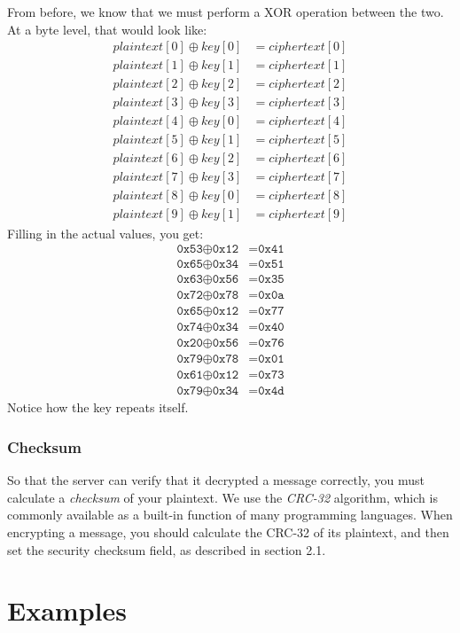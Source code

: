 \documentclass{report}
\newcommand{\code}[1]{\texttt{#1}}
\newcommand*\xor{\oplus}
\begin{document}
From before, we know that we must perform a XOR operation between the two. At a byte level, that would look like:
\begin{equation*}
\begin{split}
	plaintext[0] \xor key[0] &= ciphertext[0] \\
	plaintext[1] \xor key[1] &= ciphertext[1] \\
	plaintext[2] \xor key[2] &= ciphertext[2] \\
	plaintext[3] \xor key[3] &= ciphertext[3] \\
	plaintext[4] \xor key[0] &= ciphertext[4] \\
	plaintext[5] \xor key[1] &= ciphertext[5] \\
	plaintext[6] \xor key[2] &= ciphertext[6] \\
	plaintext[7] \xor key[3] &= ciphertext[7] \\
	plaintext[8] \xor key[0] &= ciphertext[8] \\
	plaintext[9] \xor key[1] &= ciphertext[9]
\end{split}
\end{equation*}
Filling in the actual values, you get:
\begin{equation*}
\begin{split}
	\code{0x53} \xor \code{0x12} &= \code{0x41} \\
	\code{0x65} \xor \code{0x34} &= \code{0x51} \\
	\code{0x63} \xor \code{0x56} &= \code{0x35} \\
	\code{0x72} \xor \code{0x78} &= \code{0x0a} \\
	\code{0x65} \xor \code{0x12} &= \code{0x77} \\
	\code{0x74} \xor \code{0x34} &= \code{0x40} \\
	\code{0x20} \xor \code{0x56} &= \code{0x76} \\
	\code{0x79} \xor \code{0x78} &= \code{0x01} \\
	\code{0x61} \xor \code{0x12} &= \code{0x73} \\
	\code{0x79} \xor \code{0x34} &= \code{0x4d}
\end{split}
\end{equation*}
Notice how the key repeats itself.

\subsection{Checksum}
So that the server can verify that it decrypted a message correctly, you must calculate a \emph{checksum} of your plaintext.
We use the \emph{CRC-32} algorithm, which is commonly available as a built-in function of many programming languages.
When encrypting a message, you should calculate the CRC-32 of its plaintext, and then set the security checksum field, as described in section 2.1.

\chapter{Examples}
\end{document}
